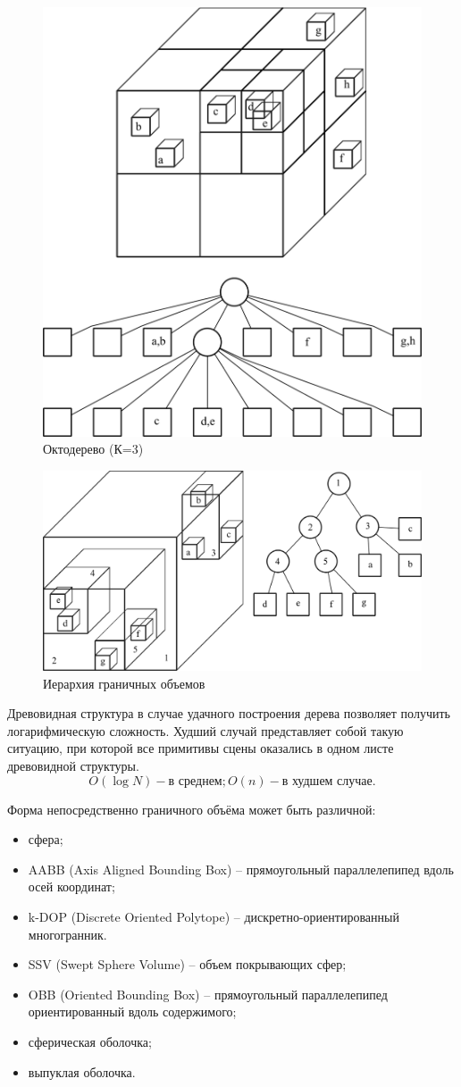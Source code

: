 \begin{figure}[h]
    \centering
    \includegraphics[width=0.5\linewidth]{Synopsis/images/octotree.png}
    \caption{Октодерево (К=3)}
    \label{fig:octotree}
\end{figure}


\begin{figure}[h]
    \centering
    \includegraphics[width=0.6\linewidth]{Synopsis/images/bvh.png}
    \caption{Иерархия граничных объемов}
    \label{fig:bvh}
\end{figure}

Древовидная структура в случае удачного построения дерева позволяет
получить логарифмическую сложность. Худший случай представляет собой
такую ситуацию, при которой все примитивы сцены оказались в одном листе
древовидной структуры.
\[O\left( \log N \right) - \text{в среднем};O\left( n \right) - \text{в худшем случае.}\]


Форма непосредственно граничного объёма может быть различной:

\begin{itemize}
    \item
    сфера;
    \item
    AABB (Axis Aligned Bounding Box) -- прямоугольный параллелепипед вдоль
    осей координат;
    \item
    k-DOP (Discrete Oriented Polytope) -- дискретно-ориентированный
    многогранник.
    \item
    SSV (Swept Sphere Volume) -- объем покрывающих сфер;
    \item
    OBB (Oriented Bounding Box) -- прямоугольный параллелепипед
    ориентированный вдоль содержимого;
    \item
    сферическая оболочка;
    \item
    выпуклая оболочка.
\end{itemize}

